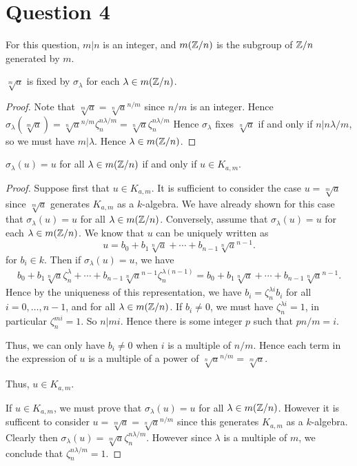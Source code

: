 \documentclass{unswmaths}
\begin{document}
\section*{Question 4}
For this question, $m|n$ is an integer, and $m(\mathbb{Z}/n)$ is the subgroup of $\mathbb{Z}/n$
generated by $m$.
\begin{lemma}
$\sqrt[m]{a}$ is fixed by $\sigma_\lambda$ for each $\lambda \in m(\mathbb{Z}/n)$.
\end{lemma}
\begin{proof}
Note that $\sqrt[m]{a} = \sqrt[n]{a}^{n/m}$ since $n/m$ is an integer.
Hence $\sigma_\lambda(\sqrt[m]{a}) = \sqrt[n]{a}^{n/m}\zeta_n^{n\lambda/m} = \sqrt[n]{a}\zeta_n^{n\lambda/m}$
Hence $\sigma_\lambda$ fixes $\sqrt[n]{a}$ if and only if $n| n\lambda/m$, so we must have $m|\lambda$.
Hence $\lambda \in m(\mathbb{Z}/n)$.
\end{proof}
\begin{theorem}
$\sigma_\lambda(u) = u$ for all $\lambda \in m(\mathbb{Z}/n)$ if and only if $u \in K_{a,m}$.
\end{theorem}
\begin{proof}
Suppose first that $u \in K_{a,m}$. It is sufficient to consider the case $u = \sqrt[m]{a}$
since $\sqrt[m]{a}$ generates $K_{a,m}$ as a $k$-algebra. We have already shown for this case that $\sigma_\lambda(u) = u$
for all $\lambda \in m(\mathbb{Z}/n)$.
Conversely, assume that $\sigma_\lambda(u) = u$ for each $\lambda \in m(\mathbb{Z}/n)$. We
know that $u$ can be uniquely written as
\begin{equation*}
u = b_0+b_1\sqrt[n]{a}+\cdots+b_{n-1}\sqrt[n]{a}^{n-1}.
\end{equation*}
for $b_i\in k$. Then if $\sigma_\lambda(u) = u$, we have
\begin{align*}
b_0+ b_1\sqrt[n]{a}\zeta_n^\lambda+\cdots+b_{n-1}\sqrt[n]{a}^{n-1}\zeta_n^{\lambda(n-1)} = b_0+b_1\sqrt[n]{a}+\cdots+b_{n-1}\sqrt[n]{a}^{n-1}.
\end{align*}
Hence by the uniqueness of this representation, we have $b_i = \zeta_n^{\lambda i}b_i$ for all $i = 0,\ldots,n-1$,
and for all $\lambda \in m(\mathbb{Z}/n)$. If $b_i \neq 0$, we must have $\zeta_n^{\lambda i} = 1$, in particular
$\zeta_n^{mi} = 1$. So $n|mi$. Hence there is some integer $p$ such that $pn/m = i$.

Thus, we can only have $b_i \neq 0$ when $i$ is a multiple of $n/m$. Hence each term 
in the expression of $u$ is a multiple of a power of $\sqrt[n]{a}^{n/m} = \sqrt[m]{a}$.

Thus, $u \in K_{a,m}$. 

If $u \in K_{a,m}$, we must prove that $\sigma_{\lambda}(u) = u$ for all $\lambda \in m(\mathbb{Z}/n)$.
However it is sufficent to consider $u = \sqrt[m]{a} = \sqrt[n]{a}^{n/m}$ since this
generates $K_{a,m}$ as a $k$-algebra. Clearly then $\sigma_\lambda(u) = \sqrt[m]{a}\zeta_n^{n\lambda/m}$.
However since $\lambda$ is a multiple of $m$, we conclude that $\zeta_n^{n\lambda/m} = 1$.
\end{proof}
\end{document}
